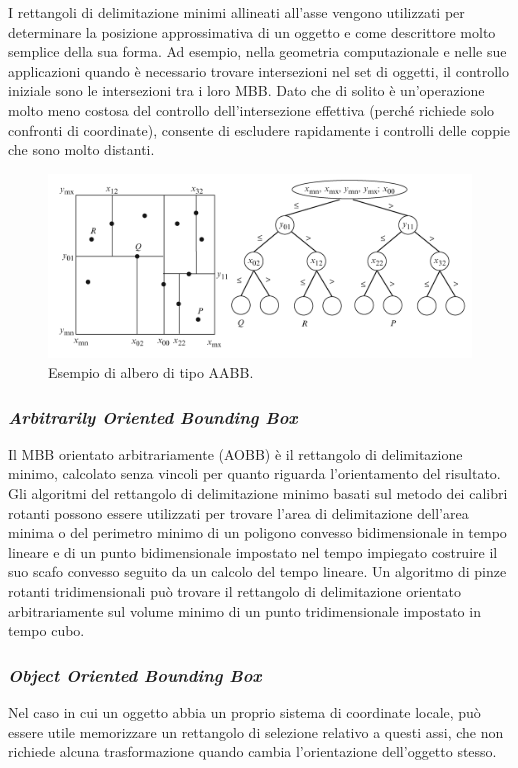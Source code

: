 I rettangoli di delimitazione minimi allineati all'asse vengono utilizzati per determinare la posizione approssimativa di un oggetto e come descrittore molto semplice della sua forma. Ad esempio, nella geometria computazionale e nelle sue applicazioni quando è necessario trovare intersezioni nel set di oggetti, il controllo iniziale sono le intersezioni tra i loro \ac{MBB}. Dato che di solito è un'operazione molto meno costosa del controllo dell'intersezione effettiva (perché richiede solo confronti di coordinate), consente di escludere rapidamente i controlli delle coppie che sono molto distanti.

\begin{figure}[h]
	\centering
	\includegraphics[width=\linewidth]{Figures/AABB}
	\caption{Esempio di albero di tipo \ac{AABB}.}
	\label{AABB}
\end{figure}
%
\subsubsection{\textit{Arbitrarily Oriented Bounding Box}}
Il \ac{MBB} orientato arbitrariamente (\ac{AOBB}) è il rettangolo di delimitazione minimo, calcolato senza vincoli per quanto riguarda l'orientamento del risultato. Gli algoritmi del rettangolo di delimitazione minimo basati sul metodo dei calibri rotanti possono essere utilizzati per trovare l'area di delimitazione dell'area minima o del perimetro minimo di un poligono convesso bidimensionale in tempo lineare e di un punto bidimensionale impostato nel tempo impiegato costruire il suo scafo convesso seguito da un calcolo del tempo lineare. Un algoritmo di pinze rotanti tridimensionali può trovare il rettangolo di delimitazione orientato arbitrariamente sul volume minimo di un punto tridimensionale impostato in tempo cubo.
%
\subsubsection{\textit{Object Oriented Bounding Box}}
Nel caso in cui un oggetto abbia un proprio sistema di coordinate locale, può essere utile memorizzare un rettangolo di selezione relativo a questi assi, che non richiede alcuna trasformazione quando cambia l'orientazione dell'oggetto stesso.

